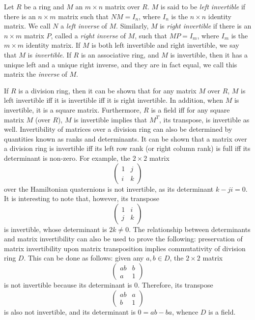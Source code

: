 \documentclass[12pt]{article}
\begin{document}
Let $R$ be a ring and $M$ an $m\times n$ matrix over $R$.  $M$ is said to be \emph{left invertible} if there is an $n\times m$ matrix such that $NM=I_n$, where $I_n$ is the $n\times n$ identity matrix.  We call $N$ a \emph{left inverse} of $M$.  Similarly, $M$ is \emph{right invertible} if there is an $n\times m$ matrix $P$, called a \emph{right inverse} of $M$, such that $MP=I_m$, where $I_m$ is the $m\times m$ identity matrix.  If $M$ is both left invertible and right invertible, we say that $M$ is \emph{invertible}.  If $R$ is an associative ring, and $M$ is invertible, then it has a unique left and a unique right inverse, and they are in fact equal, we call this matrix the \emph{inverse} of $M$.

If $R$ is a division ring, then it can be shown that for any matrix $M$ over $R$, $M$ is left invertible iff it is invertible iff it is right invertible.  In addition, when $M$ is invertible, it is a square matrix.  Furthermore, $R$ is a field iff for any square matrix $M$ (over $R$), $M$ is invertible implies that $M^T$, its transpose, is invertible as well.  Invertibility of matrices over a division ring can also be determined by quantities known as ranks and determinants.  It can be shown that a matrix over a division ring is invertible iff its left row rank (or right column rank) is full iff its determinant is non-zero.  For example, the $2\times 2$ matrix
$$\begin{pmatrix}
1 & j \\
i & k
\end{pmatrix}$$
over the Hamiltonian quaternions is not invertible, as its determinant $k-ji=0$.  It is interesting to note that, however, its transpose
$$\begin{pmatrix}
1 & i \\
j & k
\end{pmatrix}$$
is invertible, whose determinant is $2k\ne 0$.  The relationship between determinants and matrix invertibility can also be used to prove the following: preservation of matrix invertibility upon matrix transposition implies commutativity of division ring $D$.  This can be done as follows: given any $a,b\in D$, the $2\times 2$ matrix
$$\begin{pmatrix}
ab & b \\
a & 1
\end{pmatrix}$$
is not invertible because its determinant is $0$.  Therefore, its transpose
$$\begin{pmatrix}
ab & a \\
b & 1
\end{pmatrix}$$
is also not invertible, and its determinant is $0=ab-ba$, whence $D$ is a field.

\end{document}
